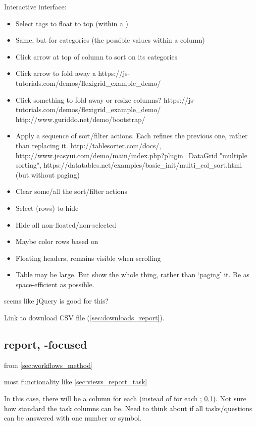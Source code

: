 Interactive interface:
\begin{itemize}
    \item Select tags to float \Elements to top (within a \Refset)
    \item Same, but for categories (\ie the possible values within a column)
    \item Click arrow at top of column to sort on its categories
    \item Click arrow to fold away a \Refset https://js-tutorials.com/demos/flexigrid_example_demo/
    \item Click something to fold away or resize columns? https://js-tutorials.com/demos/flexigrid_example_demo/ http://www.guriddo.net/demo/bootstrap/
    \item Apply a sequence of sort/filter actions.  Each refines the previous one, rather than replacing it. http://tablesorter.com/docs/, http://www.jeasyui.com/demo/main/index.php?plugin=DataGrid "multiple sorting", https://datatables.net/examples/basic_init/multi_col_sort.html (but without paging)
    \item Clear some/all the sort/filter actions
    \item Select \Elements (rows) to hide
    \item Hide all non-floated/non-selected \Elements
    \item Maybe color rows based on \Performance
    \item Floating headers, remains visible when scrolling
    \item Table may be large.  But show the whole thing, rather than `paging' it.  Be as space-efficient as possible.
\end{itemize}

seems like jQuery is good for this?

Link to download CSV file (\cref{sec:downloads_report}).

\subsection{\Performance report, \Method-focused}
\label{sec:views_report_method}

from \cref{sec:workflows_method}

most functionality like \cref{sec:views_report_task}

In this case, there will be a column for each \Task (instead of for each \Method; \cref{sec:views_report_method}).
Not sure how standard the task columns can be.
Need to think about if all tasks/questions can be answered with one number or symbol.


